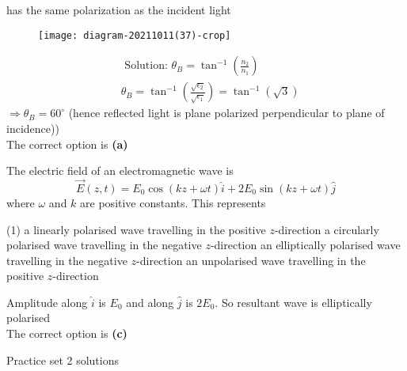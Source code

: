 \begin{enumerate}
\begin{tasks}
	\task[\textbf{D.}] has the same polarization as the incident light
\end{tasks}
\begin{answer}
	\begin{figure}[H]
		\centering
		\texttt{[image: diagram-20211011(37)-crop]}
	\end{figure}
	$$
	\begin{aligned}
	&\text { Solution: } \theta_{B}=\tan ^{-1}\left(\frac{n_{2}}{n_{1}}\right) \\
	&\theta_{B}=\tan ^{-1}\left(\frac{\sqrt{\epsilon_{2}}}{\sqrt{\epsilon_{1}}}\right)=\tan ^{-1}(\sqrt{3})
	\end{aligned}
	$$
	$\Rightarrow \theta_{B}=60^{\circ}$ (hence reflected light is plane polarized perpendicular to plane of incidence))\\
	The correct option is \textbf{(a)}	
\end{answer}
\begin{minipage}{\textwidth}
	\item The electric field of an electromagnetic wave is
	$$
	\vec{E}(z, t)=E_{0} \cos (k z+\omega t) \hat{i}+2 E_{0} \sin (k z+\omega t) \hat{j}
	$$
	where $\omega$ and $k$ are positive constants. This represents
\end{minipage}
\begin{tasks}(1)
	\task[\textbf{A.}] a linearly polarised wave travelling in the positive $z$-direction
	\task[\textbf{B.}]a circularly polarised wave travelling in the negative $z$-direction
	\task[\textbf{C.}]an elliptically polarised wave travelling in the negative $z$-direction
	\task[\textbf{D.}] an unpolarised wave travelling in the positive $z$-direction
\end{tasks}
\begin{answer}
	Amplitude along $\hat{i}$ is $E_{0}$ and along $\hat{j}$ is $2 E_{0}$. So resultant wave is elliptically polarised	\\
	The correct option is \textbf{(c)}
\end{answer}
\end{enumerate}
\newpage
\begin{abox}
	Practice set 2 solutions
	\end{abox}
